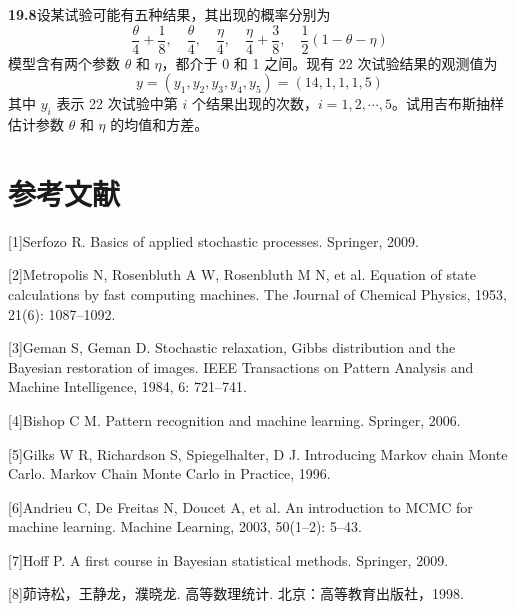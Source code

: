 \documentclass[UTF8, 12pt, fontset=fandol, oneside]{ctexart}
\begin{document}
\noindent\textbf{19.8}\quad 设某试验可能有五种结果，其出现的概率分别为
\[
\frac{\theta}{4}+\frac{1}{8},\quad
\frac{\theta}{4},\quad
\frac{\eta}{4},\quad
\frac{\eta}{4}+\frac{3}{8},\quad
\frac{1}{2}(1-\theta-\eta)
\]
模型含有两个参数 $\theta$ 和 $\eta$，都介于 0 和 1 之间。现有 22 次试验结果的观测值为
\[
y=(y_1,y_2,y_3,y_4,y_5)=(14,1,1,1,5)
\]
其中 $y_i$ 表示 22 次试验中第 $i$ 个结果出现的次数，$i=1,2,\cdots,5$。试用吉布斯抽样估计参数 $\theta$ 和 $\eta$ 的均值和方差。

\section*{参考文献}

[1]\quad Serfozo R. Basics of applied stochastic processes. Springer, 2009.

[2]\quad Metropolis N, Rosenbluth A W, Rosenbluth M N, et al. Equation of state calculations by fast computing machines. The Journal of Chemical Physics, 1953, 21(6): 1087--1092.

[3]\quad Geman S, Geman D. Stochastic relaxation, Gibbs distribution and the Bayesian restoration of images. IEEE Transactions on Pattern Analysis and Machine Intelligence, 1984, 6: 721--741.

[4]\quad Bishop C M. Pattern recognition and machine learning. Springer, 2006.

[5]\quad Gilks W R, Richardson S, Spiegelhalter, D J. Introducing Markov chain Monte Carlo. Markov Chain Monte Carlo in Practice, 1996.

[6]\quad Andrieu C, De Freitas N, Doucet A, et al. An introduction to MCMC for machine learning. Machine Learning, 2003, 50(1--2): 5--43.

[7]\quad Hoff P. A first course in Bayesian statistical methods. Springer, 2009.

[8]\quad 茆诗松，王静龙，濮晓龙. 高等数理统计. 北京：高等教育出版社，1998.
\end{document}
